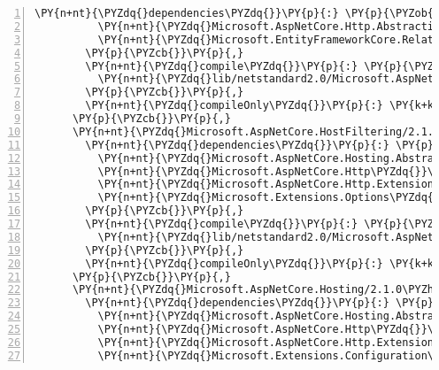 \begin{Verbatim}[commandchars=\\\{\},numbers=left,firstnumber=1,stepnumber=1,numberblanklines=0]
        \PY{n+nt}{\PYZdq{}dependencies\PYZdq{}}\PY{p}{:} \PY{p}{\PYZob{}}
          \PY{n+nt}{\PYZdq{}Microsoft.AspNetCore.Http.Abstractions\PYZdq{}}\PY{p}{:} \PY{l+s+s2}{\PYZdq{}2.1.0\PYZhy{}rc1\PYZhy{}final\PYZdq{}}\PY{p}{,}
          \PY{n+nt}{\PYZdq{}Microsoft.EntityFrameworkCore.Relational\PYZdq{}}\PY{p}{:} \PY{l+s+s2}{\PYZdq{}2.1.0\PYZhy{}rc1\PYZhy{}final\PYZdq{}}
        \PY{p}{\PYZcb{}}\PY{p}{,}
        \PY{n+nt}{\PYZdq{}compile\PYZdq{}}\PY{p}{:} \PY{p}{\PYZob{}}
          \PY{n+nt}{\PYZdq{}lib/netstandard2.0/Microsoft.AspNetCore.Diagnostics.EntityFrameworkCore.dll\PYZdq{}}\PY{p}{:} \PY{p}{\PYZob{}}\PY{p}{\PYZcb{}}
        \PY{p}{\PYZcb{}}\PY{p}{,}
        \PY{n+nt}{\PYZdq{}compileOnly\PYZdq{}}\PY{p}{:} \PY{k+kc}{true}
      \PY{p}{\PYZcb{}}\PY{p}{,}
      \PY{n+nt}{\PYZdq{}Microsoft.AspNetCore.HostFiltering/2.1.0\PYZhy{}rc1\PYZhy{}final\PYZdq{}}\PY{p}{:} \PY{p}{\PYZob{}}
        \PY{n+nt}{\PYZdq{}dependencies\PYZdq{}}\PY{p}{:} \PY{p}{\PYZob{}}
          \PY{n+nt}{\PYZdq{}Microsoft.AspNetCore.Hosting.Abstractions\PYZdq{}}\PY{p}{:} \PY{l+s+s2}{\PYZdq{}2.1.0\PYZhy{}rc1\PYZhy{}final\PYZdq{}}\PY{p}{,}
          \PY{n+nt}{\PYZdq{}Microsoft.AspNetCore.Http\PYZdq{}}\PY{p}{:} \PY{l+s+s2}{\PYZdq{}2.1.0\PYZhy{}rc1\PYZhy{}final\PYZdq{}}\PY{p}{,}
          \PY{n+nt}{\PYZdq{}Microsoft.AspNetCore.Http.Extensions\PYZdq{}}\PY{p}{:} \PY{l+s+s2}{\PYZdq{}2.1.0\PYZhy{}rc1\PYZhy{}final\PYZdq{}}\PY{p}{,}
          \PY{n+nt}{\PYZdq{}Microsoft.Extensions.Options\PYZdq{}}\PY{p}{:} \PY{l+s+s2}{\PYZdq{}2.1.0\PYZhy{}rc1\PYZhy{}final\PYZdq{}}
        \PY{p}{\PYZcb{}}\PY{p}{,}
        \PY{n+nt}{\PYZdq{}compile\PYZdq{}}\PY{p}{:} \PY{p}{\PYZob{}}
          \PY{n+nt}{\PYZdq{}lib/netstandard2.0/Microsoft.AspNetCore.HostFiltering.dll\PYZdq{}}\PY{p}{:} \PY{p}{\PYZob{}}\PY{p}{\PYZcb{}}
        \PY{p}{\PYZcb{}}\PY{p}{,}
        \PY{n+nt}{\PYZdq{}compileOnly\PYZdq{}}\PY{p}{:} \PY{k+kc}{true}
      \PY{p}{\PYZcb{}}\PY{p}{,}
      \PY{n+nt}{\PYZdq{}Microsoft.AspNetCore.Hosting/2.1.0\PYZhy{}rc1\PYZhy{}final\PYZdq{}}\PY{p}{:} \PY{p}{\PYZob{}}
        \PY{n+nt}{\PYZdq{}dependencies\PYZdq{}}\PY{p}{:} \PY{p}{\PYZob{}}
          \PY{n+nt}{\PYZdq{}Microsoft.AspNetCore.Hosting.Abstractions\PYZdq{}}\PY{p}{:} \PY{l+s+s2}{\PYZdq{}2.1.0\PYZhy{}rc1\PYZhy{}final\PYZdq{}}\PY{p}{,}
          \PY{n+nt}{\PYZdq{}Microsoft.AspNetCore.Http\PYZdq{}}\PY{p}{:} \PY{l+s+s2}{\PYZdq{}2.1.0\PYZhy{}rc1\PYZhy{}final\PYZdq{}}\PY{p}{,}
          \PY{n+nt}{\PYZdq{}Microsoft.AspNetCore.Http.Extensions\PYZdq{}}\PY{p}{:} \PY{l+s+s2}{\PYZdq{}2.1.0\PYZhy{}rc1\PYZhy{}final\PYZdq{}}\PY{p}{,}
          \PY{n+nt}{\PYZdq{}Microsoft.Extensions.Configuration\PYZdq{}}\PY{p}{:} \PY{l+s+s2}{\PYZdq{}2.1.0\PYZhy{}rc1\PYZhy{}final\PYZdq{}}\PY{p}{,}

\end{Verbatim}
